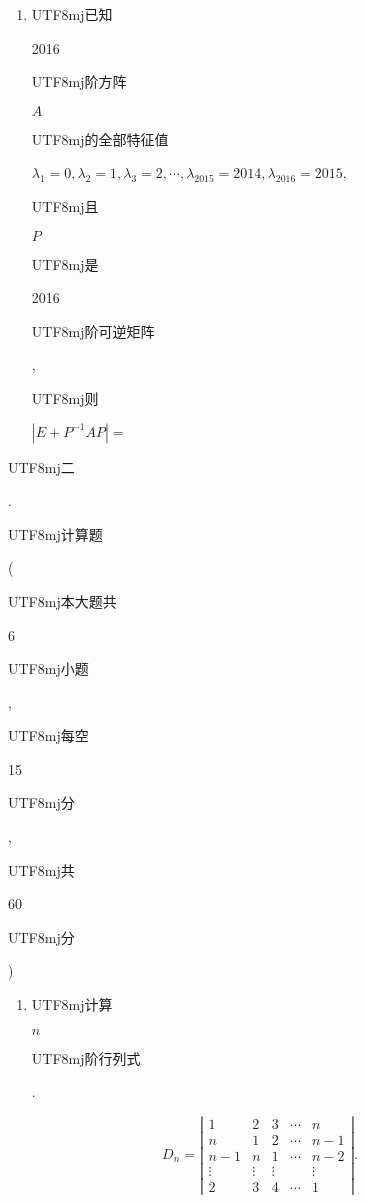 \documentclass[10pt]{article}
\begin{document}
\begin{enumerate}
  \item \begin{CJK}{UTF8}{mj}已知\end{CJK} 2016 \begin{CJK}{UTF8}{mj}阶方阵\end{CJK} $A$ \begin{CJK}{UTF8}{mj}的全部特征值\end{CJK} $\lambda_{1}=0, \lambda_{2}=1, \lambda_{3}=2, \cdots, \lambda_{2015}=2014, \lambda_{2016}=2015$, \begin{CJK}{UTF8}{mj}且\end{CJK} $P$ \begin{CJK}{UTF8}{mj}是\end{CJK} 2016 \begin{CJK}{UTF8}{mj}阶可逆矩阵\end{CJK}, \begin{CJK}{UTF8}{mj}则\end{CJK} $\left|E+P^{-1} A P\right|=$

\end{enumerate}
\begin{CJK}{UTF8}{mj}二\end{CJK}. \begin{CJK}{UTF8}{mj}计算题\end{CJK} (\begin{CJK}{UTF8}{mj}本大题共\end{CJK} 6 \begin{CJK}{UTF8}{mj}小题\end{CJK}, \begin{CJK}{UTF8}{mj}每空\end{CJK} 15 \begin{CJK}{UTF8}{mj}分\end{CJK}, \begin{CJK}{UTF8}{mj}共\end{CJK} 60 \begin{CJK}{UTF8}{mj}分\end{CJK})

\begin{enumerate}
  \item \begin{CJK}{UTF8}{mj}计算\end{CJK} $n$ \begin{CJK}{UTF8}{mj}阶行列式\end{CJK}.
\end{enumerate}
$$
D_{n}=\left|\begin{array}{ccccc}
1 & 2 & 3 & \cdots & n \\
n & 1 & 2 & \cdots & n-1 \\
n-1 & n & 1 & \cdots & n-2 \\
\vdots & \vdots & \vdots & & \vdots \\
2 & 3 & 4 & \cdots & 1
\end{array}\right| .
$$
\end{document}
